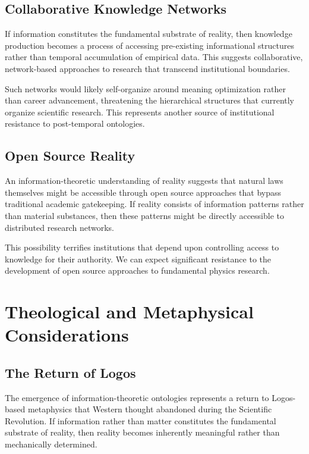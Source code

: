 \documentclass[12pt]{article}
\begin{document}
\subsection{Collaborative Knowledge Networks}

If information constitutes the fundamental substrate of reality, then knowledge production becomes a process of accessing pre-existing informational structures rather than temporal accumulation of empirical data. This suggests collaborative, network-based approaches to research that transcend institutional boundaries.

Such networks would likely self-organize around meaning optimization rather than career advancement, threatening the hierarchical structures that currently organize scientific research. This represents another source of institutional resistance to post-temporal ontologies.

\subsection{Open Source Reality}

An information-theoretic understanding of reality suggests that natural laws themselves might be accessible through open source approaches that bypass traditional academic gatekeeping. If reality consists of information patterns rather than material substances, then these patterns might be directly accessible to distributed research networks.

This possibility terrifies institutions that depend upon controlling access to knowledge for their authority. We can expect significant resistance to the development of open source approaches to fundamental physics research.

\section{Theological and Metaphysical Considerations}

\subsection{The Return of Logos}

The emergence of information-theoretic ontologies represents a return to Logos-based metaphysics that Western thought abandoned during the Scientific Revolution. If information rather than matter constitutes the fundamental substrate of reality, then reality becomes inherently meaningful rather than mechanically determined.
\end{document}
